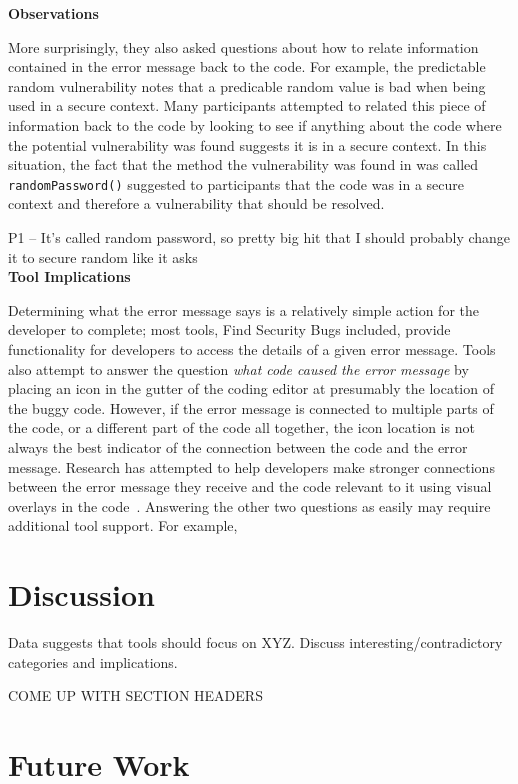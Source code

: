 \documentclass[conference]{IEEEtran}
\begin{document}
\noindent\textbf{Observations}

More surprisingly, they also asked questions about how to relate information contained in the error message back to the code. 
For example, the predictable random vulnerability notes that a predicable random value is bad when being used in a secure context. 
Many participants attempted to related this piece of information back to the code by looking to see if anything about the code where the potential vulnerability was found suggests it is in a secure context. 
In this situation, the fact that the method the vulnerability was found in was called \texttt{randomPassword()} suggested to participants that the code was in a secure context and therefore a vulnerability that should be resolved.

P1 -- It's called random password, so pretty big hit that I should probably change it to secure random like it asks
\\

\noindent\textbf{Tool Implications}

Determining what the error message says is a relatively simple action for the developer to complete; most tools, Find Security Bugs included, provide functionality for developers to access the details of a given error message. 
Tools also attempt to answer the question \emph{what code caused the error message} by placing an icon in the gutter of the coding editor at presumably the location of the buggy code. 
However, if the error message is connected to multiple parts of the code, or a different part of the code all together, the icon location is not always the best indicator of the connection between the code and the error message. 
Research has attempted to help developers make stronger connections between the error message they receive and the code relevant to it using visual overlays in the code~\cite{barik14visual}.
Answering the other two questions as easily may require additional tool support. For example, 


\section{Discussion}
\label{sec:disc}
Data suggests that tools should focus on XYZ. Discuss interesting/contradictory categories and implications.

COME UP WITH SECTION HEADERS


\section{Future Work}
\label{sec:fw}
\end{document}
